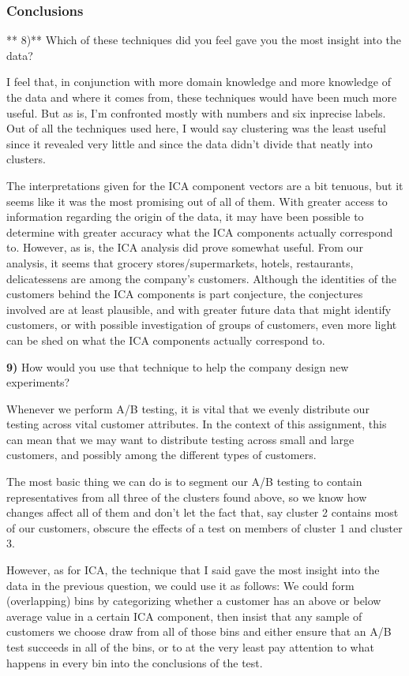 \documentclass{article}
\begin{document}
    \subsubsection{Conclusions}\label{conclusions}

** 8)** Which of these techniques did you feel gave you the most insight
into the data?

    I feel that, in conjunction with more domain knowledge and more
knowledge of the data and where it comes from, these techniques would
have been much more useful. But as is, I'm confronted mostly with
numbers and six inprecise labels. Out of all the techniques used here, I
would say clustering was the least useful since it revealed very little
and since the data didn't divide that neatly into clusters.

The interpretations given for the ICA component vectors are a bit
tenuous, but it seems like it was the most promising out of all of them.
With greater access to information regarding the origin of the data, it
may have been possible to determine with greater accuracy what the ICA
components actually correspond to. However, as is, the ICA analysis did
prove somewhat useful. From our analysis, it seems that grocery
stores/supermarkets, hotels, restaurants, delicatessens are among the
company's customers. Although the identities of the customers behind the
ICA components is part conjecture, the conjectures involved are at least
plausible, and with greater future data that might identify customers,
or with possible investigation of groups of customers, even more light
can be shed on what the ICA components actually correspond to.

    \textbf{9)} How would you use that technique to help the company design
new experiments?

    Whenever we perform A/B testing, it is vital that we evenly distribute
our testing across vital customer attributes. In the context of this
assignment, this can mean that we may want to distribute testing across
small and large customers, and possibly among the different types of
customers.

The most basic thing we can do is to segment our A/B testing to contain
representatives from all three of the clusters found above, so we know
how changes affect all of them and don't let the fact that, say cluster
2 contains most of our customers, obscure the effects of a test on
members of cluster 1 and cluster 3.

However, as for ICA, the technique that I said gave the most insight
into the data in the previous question, we could use it as follows: We
could form (overlapping) bins by categorizing whether a customer has an
above or below average value in a certain ICA component, then insist
that any sample of customers we choose draw from all of those bins and
either ensure that an A/B test succeeds in all of the bins, or to at the
very least pay attention to what happens in every bin into the
conclusions of the test.
\end{document}
